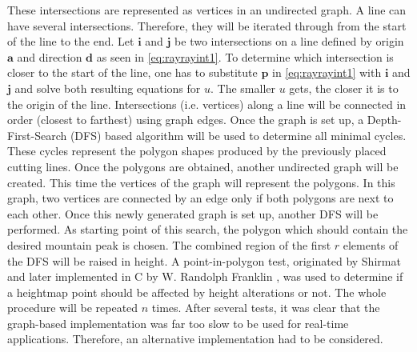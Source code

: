\documentclass[11pt,a4paper,twoside,openright]{report}
\begin{document}
These intersections are represented as vertices in an undirected graph. A line can have several intersections. Therefore, they will be iterated through from the start of the line to the end. Let $\mathbf{i}$ and $\mathbf{j}$ be two intersections on a line defined by origin $\mathbf{a}$ and direction $\mathbf{d}$ as seen in \cref{eq:rayrayint1}. To determine which intersection is closer to the start of the line, one has to substitute $\mathbf{p}$ in \cref{eq:rayrayint1} with $\mathbf{i}$ and $\mathbf{j}$ and solve both resulting equations for $u$. The smaller $u$ gets, the closer it is to the origin of the line. Intersections (i.e. vertices) along a line will be connected in order (closest to farthest) using graph edges. Once the graph is set up, a Depth-First-Search (DFS) based algorithm will be used to determine all minimal cycles. These cycles represent the polygon shapes produced by the previously placed cutting lines. Once the polygons are obtained, another undirected graph will be created. This time the vertices of the graph will represent the polygons. In this graph, two vertices are connected by an edge only if both polygons are next to each other. Once this newly generated graph is set up, another DFS will be performed. As starting point of this search, the polygon which should contain the desired mountain peak is chosen. The combined region of the first $r$ elements of the DFS will be raised in height. A point-in-polygon test, originated by Shirmat \cite{Shimrat:1962:APP:368637.368653} and later implemented in C by W. Randolph Franklin \cite{Franklin:1994}, was used to determine if a heightmap point should be affected by height alterations or not. The whole procedure will be repeated $n$ times. After several tests, it was clear that the graph-based implementation was far too slow to be used for real-time applications. Therefore, an alternative implementation had to be considered.
\end{document}
